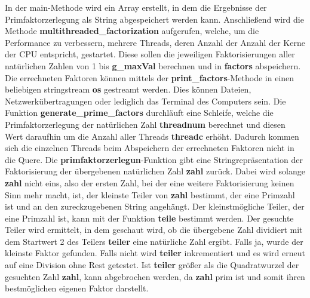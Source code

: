 \newpage
In der main-Methode wird ein Array erstellt, in dem die Ergebnisse der Primfaktorzerlegung als String abgespeichert werden kann. Anschließend wird die Methode \textbf{multithreaded\_factorization} aufgerufen, welche, um die Performance zu verbessern, mehrere Threads, deren Anzahl der Anzahl der Kerne der CPU entspricht, gestartet. Diese sollen die jeweiligen Faktorisierungen aller natürlichen Zahlen von 1 bis \textbf{g\_maxVal} berechnen und in \textbf{factors} abspeichern. Die errechneten Faktoren können mittels der \textbf{print\_factors}-Methode in einen beliebigen stringstream \textbf{os} gestreamt werden. Dies können Dateien, Netzwerkübertragungen oder lediglich das Terminal des Computers sein. Die Funktion \textbf{generate\_prime\_factors} durchläuft eine Schleife, welche die Primfaktorzerlegung der natürlichen Zahl \textbf{threadnum} berechnet und diesen Wert daraufhin um die Anzahl aller Threads \textbf{threadc} erhöht. Dadurch kommen sich die einzelnen Threads beim Abspeichern der errechneten Faktoren nicht in die Quere. Die \textbf{primfaktorzerlegun}-Funktion gibt eine Stringrepräsentation der Faktorisierung der übergebenen natürlichen Zahl \textbf{zahl} zurück. Dabei wird solange \textbf{zahl} nicht eins, also der ersten Zahl, bei der eine weitere Faktorisierung keinen Sinn mehr macht, ist, der kleinste Teiler von \textbf{zahl} bestimmt, der eine Primzahl ist und an den zureckzugebenen String angehängt. Der kleinstmögliche Teiler, der eine Primzahl ist, kann mit der Funktion \textbf{teile} bestimmt werden. Der gesuchte Teiler wird ermittelt, in dem geschaut wird, ob die übergebene Zahl dividiert mit dem Startwert 2 des Teilers \textbf{teiler} eine natürliche Zahl ergibt. Falls ja, wurde der kleinste Faktor gefunden. Falls nicht wird \textbf{teiler} inkrementiert und es wird erneut auf eine Division ohne Rest getestet. Ist \textbf{teiler} größer als die Quadratwurzel der gesuchten Zahl \textbf{zahl}, kann abgebrochen werden, da \textbf{zahl} prim ist und somit ihren bestmöglichen eigenen Faktor darstellt.
